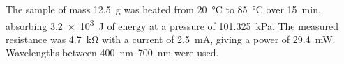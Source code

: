 \documentclass{article}
\begin{document}
The sample of mass \qty{12.5}{\gram} was heated from \qty{20}{\celsius} to \qty{85}{\celsius} over \qty{15}{\minute}, absorbing \qty{3.2e3}{\joule} of energy at a pressure of \qty{101.325}{\kilo\pascal}. The measured resistance was \qty{4.7}{\kilo\ohm} with a current of \qty{2.5}{\milli\ampere}, giving a power of \qty{29.4}{\milli\watt}. Wavelengths between \qtyrange{400}{700}{\nano\metre} were used.
\end{document}
